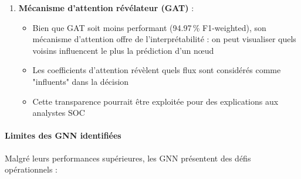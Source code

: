 ﻿\documentclass[11pt,a4paper]{article}
\begin{document}
\begin{enumerate}
    \item \textbf{Mécanisme d'attention révélateur (GAT)} :
    \begin{itemize}
        \item Bien que GAT soit moins performant (94.97\,\% F1-weighted), son mécanisme d'attention offre de l'interprétabilité : on peut visualiser quels voisins influencent le plus la prédiction d'un nœud
        \item Les coefficients d'attention révèlent quels flux sont considérés comme "influents" dans la décision
        \item Cette transparence pourrait être exploitée pour des explications aux analystes SOC
    \end{itemize}
\end{enumerate}

\paragraph{Limites des GNN identifiées}

Malgré leurs performances supérieures, les GNN présentent des défis opérationnels :
\end{document}
